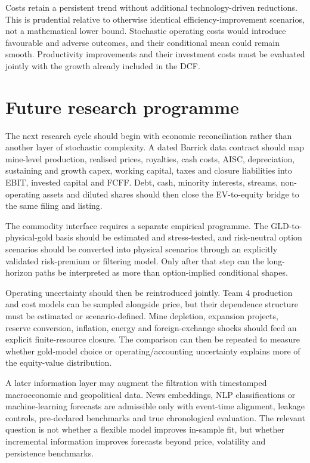 Costs retain a persistent trend without additional technology-driven reductions.
This is prudential relative to otherwise identical efficiency-improvement
scenarios, not a mathematical lower bound. Stochastic operating costs would
introduce favourable and adverse outcomes, and their conditional mean could
remain smooth. Productivity improvements and their investment costs must be
evaluated jointly with the growth already included in the DCF.

\section*{Future research programme}

The next research cycle should begin with economic reconciliation rather than
another layer of stochastic complexity. A dated Barrick data contract should
map mine-level production, realised prices, royalties, cash costs, AISC,
depreciation, sustaining and growth capex, working capital, taxes and closure
liabilities into EBIT, invested capital and FCFF. Debt, cash, minority
interests, streams, non-operating assets and diluted shares should then close
the EV-to-equity bridge to the same filing and listing.

The commodity interface requires a separate empirical programme. The GLD-to-
physical-gold basis should be estimated and stress-tested, and risk-neutral
option scenarios should be converted into physical scenarios through an
explicitly validated risk-premium or filtering model. Only after that step can
the long-horizon paths be interpreted as more than option-implied conditional
shapes.

Operating uncertainty should then be reintroduced jointly. Team 4 production
and cost models can be sampled alongside price, but their dependence structure
must be estimated or scenario-defined. Mine depletion, expansion projects,
reserve conversion, inflation, energy and foreign-exchange shocks should feed
an explicit finite-resource closure. The comparison can then be repeated to
measure whether gold-model choice or operating/accounting uncertainty explains
more of the equity-value distribution.

A later information layer may augment the filtration with timestamped
macroeconomic and geopolitical data. News embeddings, NLP classifications or
machine-learning forecasts are admissible only with event-time alignment,
leakage controls, pre-declared benchmarks and true chronological evaluation.
The relevant question is not whether a flexible model improves in-sample fit,
but whether incremental information improves forecasts beyond price,
volatility and persistence benchmarks.

